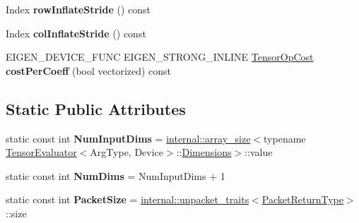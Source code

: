 \begin{DoxyCompactItemize}
Index {\bfseries row\+Inflate\+Stride} () const
\item 
\mbox{\label{struct_eigen_1_1_tensor_evaluator_3_01const_01_tensor_image_patch_op_3_01_rows_00_01_cols_00_01_arg_type_01_4_00_01_device_01_4_a8583e89a54da6001f92c963e5266bd34}} 
Index {\bfseries col\+Inflate\+Stride} () const
\item 
\mbox{\label{struct_eigen_1_1_tensor_evaluator_3_01const_01_tensor_image_patch_op_3_01_rows_00_01_cols_00_01_arg_type_01_4_00_01_device_01_4_ae72b8d8c901783bdaef4a413989dcf18}} 
E\+I\+G\+E\+N\+\_\+\+D\+E\+V\+I\+C\+E\+\_\+\+F\+U\+NC E\+I\+G\+E\+N\+\_\+\+S\+T\+R\+O\+N\+G\+\_\+\+I\+N\+L\+I\+NE \hyperlink{class_eigen_1_1_tensor_op_cost}{Tensor\+Op\+Cost} {\bfseries cost\+Per\+Coeff} (bool vectorized) const
\end{DoxyCompactItemize}
\subsection*{Static Public Attributes}
\begin{DoxyCompactItemize}
\item 
\mbox{\label{struct_eigen_1_1_tensor_evaluator_3_01const_01_tensor_image_patch_op_3_01_rows_00_01_cols_00_01_arg_type_01_4_00_01_device_01_4_a2fba17584c4a0a4fd5e8950222b440d7}} 
static const int {\bfseries Num\+Input\+Dims} = \hyperlink{struct_eigen_1_1internal_1_1array__size}{internal\+::array\+\_\+size}$<$typename \hyperlink{struct_eigen_1_1_tensor_evaluator}{Tensor\+Evaluator}$<$Arg\+Type, Device$>$\+::\hyperlink{struct_eigen_1_1_d_sizes}{Dimensions}$>$\+::value
\item 
\mbox{\label{struct_eigen_1_1_tensor_evaluator_3_01const_01_tensor_image_patch_op_3_01_rows_00_01_cols_00_01_arg_type_01_4_00_01_device_01_4_adc50fb0547e13401a24137730fa7e68a}} 
static const int {\bfseries Num\+Dims} = Num\+Input\+Dims + 1
\item 
\mbox{\label{struct_eigen_1_1_tensor_evaluator_3_01const_01_tensor_image_patch_op_3_01_rows_00_01_cols_00_01_arg_type_01_4_00_01_device_01_4_ad52cfa325b02445d68697f5150cc6df4}} 
static const int {\bfseries Packet\+Size} = \hyperlink{struct_eigen_1_1internal_1_1unpacket__traits}{internal\+::unpacket\+\_\+traits}$<$\hyperlink{group___sparse_core___module}{Packet\+Return\+Type}$>$\+::size
\end{DoxyCompactItemize}
